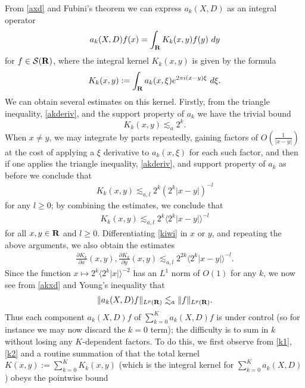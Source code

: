 \documentclass[11pt]{article}
\theoremstyle{definition}
\begin{document}
From \eqref{axd} and Fubini’s theorem we can express \({a_k(X,D)}\) as an integral operator 
\begin{align}\label{akxd}
  a_k(X,D) f(x) = \int_{\bf R} K_k(x,y) f(y)\ dy 
\end{align}
 for \({f \in \mathcal{S}({\bf R})}\), where the integral kernel \({K_k(x,y)}\) is given by the formula 
\begin{align}\label{kiwi}
  K_k(x,y) := \int_{\bf R} a_k(x,\xi) e^{2\pi i (x-y) \xi}\ d\xi. 
\end{align}
 We can obtain several estimates on this kernel. Firstly, from the triangle inequality, \eqref{akderiv}, and the support property of \({a_k}\) we have the trivial bound 
\[\displaystyle  K_k(x,y) \lesssim_a 2^k.\]
 When \({x \neq y}\), we may integrate by parts repeatedly, gaining factors of \({O(\frac{1}{|x-y|})}\) at the cost of applying a \({\xi}\) derivative to \({a_k(x,\xi)}\) for each such factor, and then if one applies the triangle inequality, \eqref{akderiv}, and support property of \({a_k}\) as before we conclude that 
\begin{align}\label{k1}
  K_k(x,y) \lesssim_{a,l} 2^k (2^k |x-y|)^{-l} 
\end{align}
 for any \({l \geq 0}\); by combining the estimates, we conclude that 
\begin{align}\label{k2}
  K_k(x,y) \lesssim_{a,l} 2^k \langle 2^k |x-y|\rangle^{-l} 
\end{align}
 for all \({x,y \in {\bf R}}\) and \({l \geq 0}\). Differentiating \eqref{kiwi} in \({x}\) or \({y}\), and repeating the above arguments, we also obtain the estimates 
\begin{align}\label{k3}
  \frac{\partial K_k}{\partial x}(x,y), \frac{\partial K_k}{\partial y}(x,y) \lesssim_{a,l} 2^{2k} \langle 2^k |x-y|\rangle^{-l}. 
\end{align}
 Since the function \({x \mapsto 2^k \langle 2^k |x| \rangle^{-2}}\) has an \({L^1}\) norm of \({O(1)}\) for any \({k}\), we now see from \eqref{akxd} and Young’s inequality that 
\begin{align}\label{akxd-bound}
  \| a_k(X,D) f\|_{L^p({\bf R})} \lesssim_a \|f\|_{L^p({\bf R})}. 
\end{align}
 Thus each component \({a_k(X,D) f}\) of \({\sum_{k=0}^K a_k(X,D) f}\) is under control (so for instance we may now discard the \({k=0}\) term); the difficulty is to sum in \({k}\) without losing any \({K}\)-dependent factors. To do this, we first observe from \eqref{k1}, \eqref{k2} and a routine summation of that the total kernel \({K(x,y) := \sum_{k=0}^K K_k(x,y)}\) (which is the integral kernel for \({\sum_{k=0}^K a_k(X,D)}\)) obeys the pointwise bound 
\end{document}
